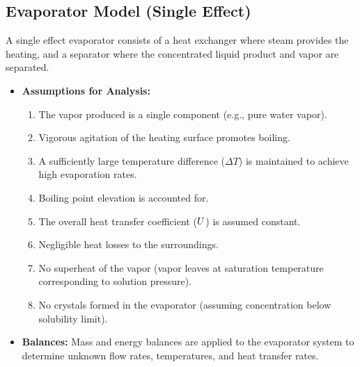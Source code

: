 \subsection{Evaporator Model (Single Effect)}
A single effect evaporator consists of a heat exchanger where steam provides the heating, and a separator where the concentrated liquid product and vapor are separated.
\begin{itemize}
    \item \textbf{Assumptions for Analysis:}
        \begin{enumerate}
            \item The vapor produced is a single component (e.g., pure water vapor).
            \item Vigorous agitation of the heating surface promotes boiling.
            \item A sufficiently large temperature difference ($\Delta T$) is maintained to achieve high evaporation rates.
            \item Boiling point elevation is accounted for.
            \item The overall heat transfer coefficient ($U$) is assumed constant.
            \item Negligible heat losses to the surroundings.
            \item No superheat of the vapor (vapor leaves at saturation temperature corresponding to solution pressure).
            \item No crystals formed in the evaporator (assuming concentration below solubility limit).
        \end{enumerate}
    \item \textbf{Balances:} Mass and energy balances are applied to the evaporator system to determine unknown flow rates, temperatures, and heat transfer rates.
\end{itemize}

